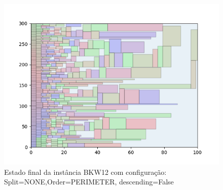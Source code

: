 \begin{figure}[H]
    \centering
    \caption[]{Estado final da instância BKW12 com configuração: Split=NONE,Order=PERIMETER, descending=False}
    \label{fig:bkw12-none-perimeter-false}
    \includegraphics[scale=0.5]{output/figures/bkw/bkw12/none/perimeter/false/000}
\end{figure}